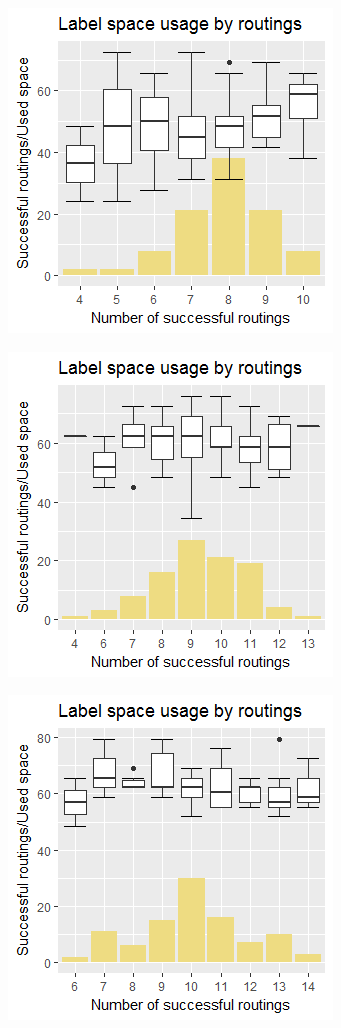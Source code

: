 \documentclass[11pt,a4paper]{vutinfth}
\begin{document}
 \begin{figure}
 	\centering
 	\begin{subfigure}[b]{\textwidth}
 		\centering
 		\includegraphics[scale=0.8]{Rplot_10u.png}
 		\caption{\label{fig:10u}}
 	\end{subfigure}
 	
 	\begin{subfigure}[b]{\textwidth}
 		\centering
 		\includegraphics[scale=0.8]{Rplot_15u.png}
 		\caption{\label{fig:15u}}
 	\end{subfigure}
    \begin{subfigure}[b]{\textwidth}
		 \centering
		 \includegraphics[scale=0.8]{Rplot_30u.png}
		 \caption{\label{fig:30u}}
    \end{subfigure}
 

\end{figure}
\end{document}
